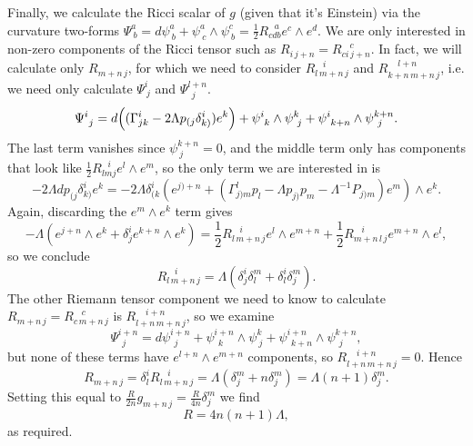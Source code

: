 Finally, we calculate the Ricci scalar of $g$ (given that it's Einstein)
via the curvature two-forms $\Psi_{\ b}^{a}={d}\psi_{\ b}^{a}+\psi_{\ c}^{a}\wedge\psi_{\ b}^{c}=\frac{1}{2}R_{cdb}^{\ \ \ a}e^{c}\wedge e^{d}$.
We are only interested in non-zero components of the Ricci tensor
such as $R_{i\, j+n}=R_{ci\, j+n}^{\ \ \ \ c}$. In fact, we will
calculate only $R_{m+n\, j}$, for which we need to consider $R_{l\, m+n\, j}^{\ \ \ \ i}$
and $R_{k+n\, m+n\, j}^{\ \ \ \ \ l+n}$, i.e. we need only calculate
$\Psi_{\ j}^{i}$ and $\Psi_{\ \ j}^{l+n}$. 
\[
\Psi_{\ j}^{i}= d\Bigl((\Gamma_{jk}^{i}-2\Lambda p_{(j}\delta_{k)}^{i})e^{k}\Bigr)+\psi_{\ k}^{i}\wedge\psi_{\ j}^{k}+\psi_{\ k+n}^{i}\wedge\psi_{\ j}^{k+n}.
\]
The last term vanishes since $\psi_{\ j}^{k+n}=0$, and the middle
term only has components that look like $\frac{1}{2}R_{lmj}^{\ \ \ i}e^{l}\wedge e^{m}$,
so the only term we are interested in is 
\[
-2\Lambda dp_{(j}\delta_{k)}^{i}e^{k}=-2\Lambda\delta_{(k}^{i}(e^{j)+n}+(\Gamma_{j)m}^{l}p_{l}-\Lambda p_{j)}p_{m}-\Lambda^{-1}P_{j)m})e^{m})\wedge e^{k}.
\]
Again, discarding the $e^{m}\wedge e^{k}$ term gives
\[
-\Lambda(e^{j+n}\wedge e^{k}+\delta_{j}^{i}e^{k+n}\wedge e^{k})=\frac{1}{2}R_{l\, m+n\, j}^{\ \ \ \ i}e^{l}\wedge e^{m+n}+\frac{1}{2}R_{m+n\, l\, j}^{\ \ \ \ i}e^{m+n}\wedge e^{l},
\]
so we conclude
\[
R_{l\, m+n\, j}^{\ \ \ \ i}=\Lambda(\delta_{j}^{i}\delta_{l}^{m}+\delta_{l}^{i}\delta_{j}^{m}).
\]
The other Riemann tensor component we need to know to calculate $R_{m+n\, j}=R_{c\, m+n\, j}^{\ \ \ \ c}$
is $R_{l+n\, m+n\, j}^{\ \ \ \ \ i+n}$, so we examine
\[
\Psi_{\ \ j}^{i+n}={d}\psi_{\ \ j}^{i+n}+\psi_{\ \ k}^{i+n}\wedge\psi_{\ j}^{k}+\psi_{\ \ k+n}^{i+n}\wedge\psi_{\ \ j}^{k+n},
\]
but none of these terms have $e^{l+n}\wedge e^{m+n}$ components,
so $R_{l+n\, m+n\, j}^{\ \ \ \ \ i+n}=0$. Hence 
\[
R_{m+n\, j}=\delta_{l}^{i}R_{l\, m+n\, j}^{\ \ \ \ i}=\Lambda(\delta_{j}^{m}+n\delta_{j}^{m})=\Lambda(n+1)\delta_{j}^{m}.
\]
Setting this equal to $\frac{R}{2n}g_{m+n\, j}=\frac{R}{4n}\delta_{j}^{m}$
we find 
\[
R=4n(n+1)\Lambda,
\]
as required.